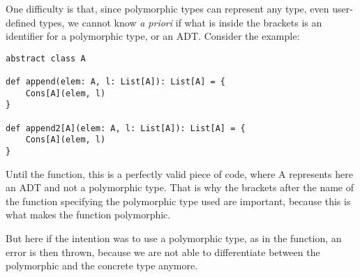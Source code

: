 One difficulty is that, since polymorphic types can represent any type, even user-defined types, we cannot know \emph{a priori} if what is inside the brackets is an identifier for a polymorphic type, or an ADT. Consider the example:
\begin{lstlisting}
abstract class A

def append(elem: A, l: List[A]): List[A] = {
    Cons[A](elem, l)
}

def append2[A](elem: A, l: List[A]): List[A] = {
    Cons[A](elem, l)
}
\end{lstlisting}
Until the  function, this is a perfectly valid piece of code, where A represents here an ADT and not a polymorphic type. 
That is why the brackets after the name of the function specifying the polymorphic type used are important, because this is what makes the function polymorphic. 

But here if the intention was to use a polymorphic type, as in the  function, an error is then thrown, because we are not able to differentiate between the polymorphic and the concrete type anymore.

